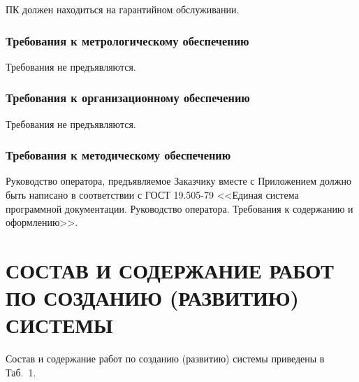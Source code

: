 \documentclass[12pt,a4paper]{article}
\begin{document}
\noindent ПК должен находиться на гарантийном обслуживании.

\subsubsection{Требования к метрологическому обеспечению}
Требования не предъявляются.

\subsubsection{Требования к организационному обеспечению}
Требования не предъявляются.

\subsubsection{Требования к методическому обеспечению}
Руководство оператора, предъявляемое Заказчику вместе с Приложением должно быть написано в соответствии с 
ГОСТ 19.505-79 <<Единая система программной документации. Руководство оператора. Требования к содержанию и
оформлению>>.

\newpage
\section{СОСТАВ И СОДЕРЖАНИЕ РАБОТ ПО СОЗДАНИЮ (РАЗВИТИЮ) СИСТЕМЫ} \label{test}
Состав и содержание работ по созданию (развитию) системы приведены в Таб.~1.
\end{document}
